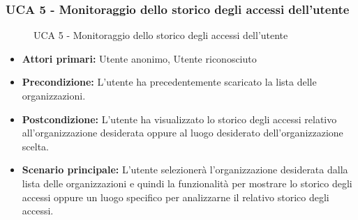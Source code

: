 \subsubsection{UCA 5 - Monitoraggio dello storico degli accessi dell'utente}
\begin{figure}[h]
	\centering	
	\caption{UCA 5 - Monitoraggio dello storico degli accessi dell'utente}
\end{figure}

\begin{itemize}
    \item \textbf{Attori primari:} Utente anonimo, Utente riconosciuto
    \item \textbf{Precondizione:} L'utente ha precedentemente scaricato la lista delle organizzazioni.
    \item \textbf{Postcondizione:} L'utente ha visualizzato lo storico degli accessi relativo all'organizzazione desiderata oppure al luogo desiderato dell'organizzazione scelta.
    \item \textbf{Scenario principale:} L'utente selezionerà l'organizzazione desiderata dalla lista delle organizzazioni e quindi la funzionalità per mostrare lo storico degli accessi oppure un luogo specifico per analizzarne il relativo storico degli accessi.
\end{itemize}

